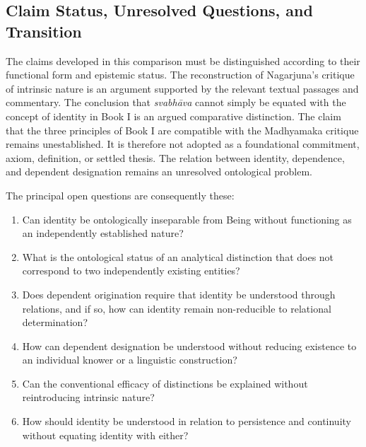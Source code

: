 \subsection{Claim Status, Unresolved Questions, and Transition}
\label{subsec:ch08_s18_ss20}

\label{para:VS.B01.P01.C08.S18.SS20.P001}
The claims developed in this comparison must be distinguished according to their functional form and epistemic status. The reconstruction of Nagarjuna's critique of intrinsic nature is an argument supported by the relevant textual passages and commentary. The conclusion that \emph{svabh\={a}va} cannot simply be equated with the concept of identity in Book I is an argued comparative distinction. The claim that the three principles of Book I are compatible with the Madhyamaka critique remains unestablished. It is therefore not adopted as a foundational commitment, axiom, definition, or settled thesis. The relation between identity, dependence, and dependent designation remains an unresolved ontological problem.

\label{para:VS.B01.P01.C08.S18.SS20.P002}
The principal open questions are consequently these:

\begin{enumerate}
    \item Can identity be ontologically inseparable from Being without functioning as an independently established nature?
    \item What is the ontological status of an analytical distinction that does not correspond to two independently existing entities?
    \item Does dependent origination require that identity be understood through relations, and if so, how can identity remain non-reducible to relational determination?
    \item How can dependent designation be understood without reducing existence to an individual knower or a linguistic construction?
    \item Can the conventional efficacy of distinctions be explained without reintroducing intrinsic nature?
    \item How should identity be understood in relation to persistence and continuity without equating identity with either?
\end{enumerate}

